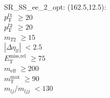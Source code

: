 SR\_SS\_ee\_2\_opt: (162.5,12.5): \\
$p_{\text{T}}^{l1}$ $\geq 20$ \\
$p_{\text{T}}^{l2}$ $\geq 20$ \\
$m_{T2}$ $\geq 15$ \\
$|\Delta\eta_{ll}|$ $<2.5$ \\
$E_{\text{T}}^{\text{miss,rel}}$ $\geq 75$ \\
$m_{\text{eff}}$ $\geq 200$ \\
$m_{\text{T}}^{\text{max}}$ $\geq 90$ \\
$m_{lj}$/$m_{ljj}$ $<130$ \\
